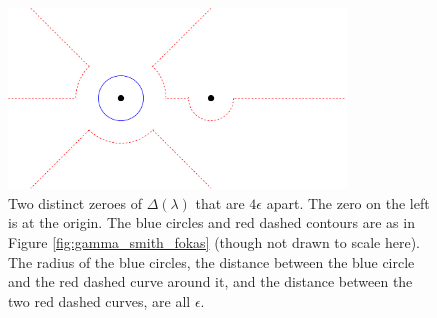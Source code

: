 \documentclass[11pt, oneside, a4paper]{article}
\begin{document}
\begin{figure}[htpb!]
    \centering
    \includegraphics[width=0.8\textwidth]{epsilon_2_ps.png}
    \caption{Two distinct zeroes of $\Delta(\lambda)$ that are $4\epsilon$ apart. The zero on the left is at the origin. The blue circles and red dashed contours are as in Figure \ref{fig:gamma_smith_fokas} (though not drawn to scale here). The radius of the blue circles, the distance between the blue circle and the red dashed curve around it, and the distance between the two red dashed curves, are all $\epsilon$.}
    \label{fig:epsilon_2}
\end{figure}
\end{document}
